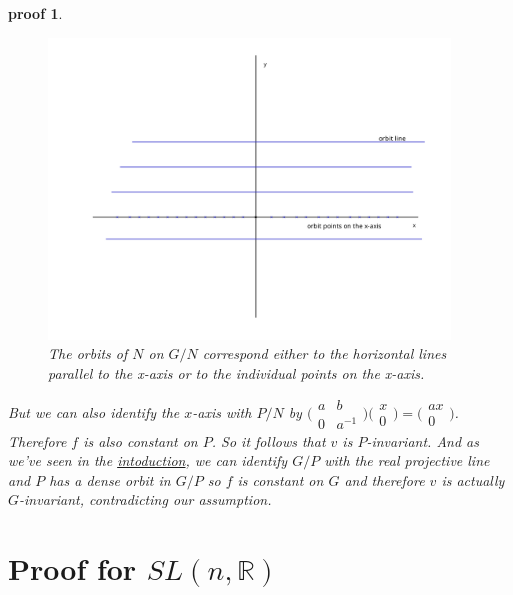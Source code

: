 \documentclass[
  12pt
]{article}
\theoremstyle{break}
\theoremstyle{plain}
\newtheorem*{pf}{proof}
\newcommand{\G}{\ensuremath{G}}
\newcommand{\ipmatrix}[1]{%
\ensuremath{\big(\begin{smallmatrix} #1 \end{smallmatrix}\big)}}
\begin{document}
\begin{pf}
    \begin{figure}
      \begin{center}
        \includegraphics[width=0.95\textwidth]{N-orbits-in-R2-1.png}
      \end{center}
      \caption{The orbits of $N$ on $G/N$ correspond either to the horizontal lines parallel to the x-axis or to the individual points on the x-axis. }
      \label{fig:n-orbits-in-r2}
    \end{figure}

    But we can also identify the $x$-axis with $P/N$ by $\ipmatrix{a & b \\ 0 &
    a^{-1}}\ipmatrix{x \\ 0} = \ipmatrix{ax \\ 0}$. Therefore $f$ is also
    constant on $P$. So it follows that $v$ is $P$-invariant. And as we've seen
    in the \hyperref[sec:introduction]{intoduction}, we can identify $G/P$ with
    the real projective line and $P$ has a dense orbit in $G/P$ so $f$ is
    constant on $G$ and therefore $v$ is actually \G-invariant, contradicting our
    assumption.
  \end{pf}









\hypertarget{proof-for-slnr}{%
  \section{Proof for \texorpdfstring{$SL(n, \mathbb{R})$}{SL(n, R)}}
\label{proof-for-slnr}}
\end{document}
